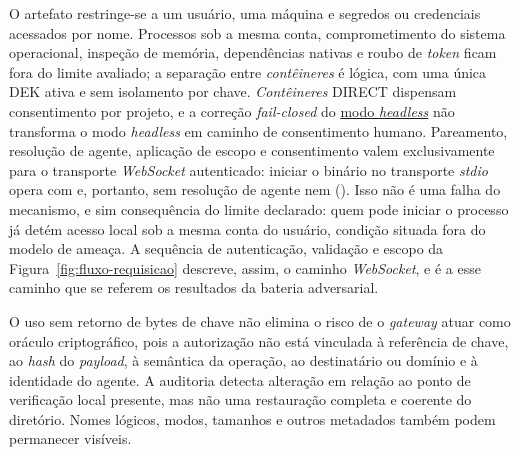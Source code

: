 O artefato restringe-se a um usuário, uma máquina e segredos ou credenciais acessados por nome. Processos sob a mesma conta, comprometimento do sistema operacional, inspeção de memória, dependências nativas e roubo de \textit{token} ficam fora do limite avaliado; a separação entre \textit{contêineres} é lógica, com uma única DEK ativa e sem isolamento por chave. \textit{Contêineres} DIRECT dispensam consentimento por projeto, e a correção \textit{fail-closed} do \hyperref[nota:headless]{modo \textit{headless}} não transforma o modo \textit{headless} em caminho de consentimento humano. Pareamento, resolução de agente, aplicação de escopo e consentimento valem exclusivamente para o transporte \textit{WebSocket} autenticado: iniciar o binário no transporte \textit{stdio} opera com  e, portanto, sem resolução de agente nem  (). Isso não é uma falha do mecanismo, e sim consequência do limite declarado: quem pode iniciar o processo já detém acesso local sob a mesma conta do usuário, condição situada fora do modelo de ameaça. A sequência de autenticação, validação e escopo da Figura~\ref{fig:fluxo-requisicao} descreve, assim, o caminho \textit{WebSocket}, e é a esse caminho que se referem os resultados da bateria adversarial.

O uso sem retorno de bytes de chave não elimina o risco de o \textit{gateway} atuar como oráculo criptográfico, pois a autorização não está vinculada à referência de chave, ao \textit{hash} do \textit{payload}, à semântica da operação, ao destinatário ou domínio e à identidade do agente. A auditoria detecta alteração em relação ao ponto de verificação local presente, mas não uma restauração completa e coerente do diretório. Nomes lógicos, modos, tamanhos e outros metadados também podem permanecer visíveis.

